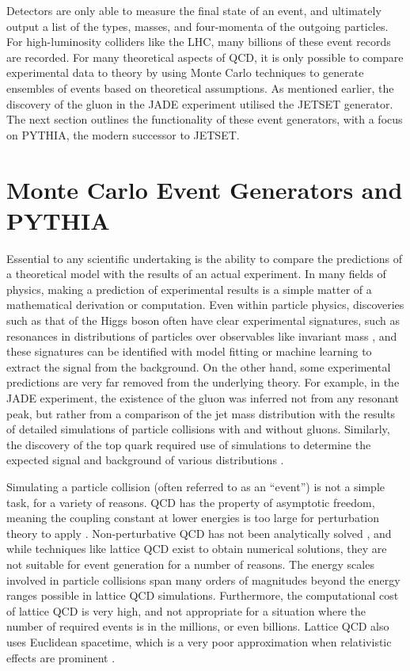 \documentclass[12pt,a4paper]{report}
\begin{document}
Detectors are only able to measure the final state of an event, and ultimately output a list of the types, masses, and four-momenta of the outgoing particles. For high-luminosity colliders like the LHC, many billions of these event records are recorded. For many theoretical aspects of QCD, it is only possible to compare experimental data to theory by using Monte Carlo techniques to generate ensembles of events based on theoretical assumptions. As mentioned earlier, the discovery of the gluon in the JADE experiment utilised the JETSET generator. The next section outlines the functionality of these event generators, with a focus on PYTHIA, the modern successor to JETSET.

\section{Monte Carlo Event Generators and PYTHIA}
Essential to any scientific undertaking is the ability to compare the predictions of a theoretical model with the results of an actual experiment. In many fields of physics, making a prediction of experimental results is a simple matter of a mathematical derivation or computation. Even within particle physics, discoveries such as that of the Higgs boson often have clear experimental signatures, such as resonances in distributions of particles over observables like invariant mass \cite{ATLAS:2012yve,CMS:2012qbp}, and these signatures can be identified with model fitting or machine learning to extract the signal from the background. On the other hand, some experimental predictions are very far removed from the underlying theory. For example, in the JADE experiment, the existence of the gluon was inferred not from any resonant peak, but rather from a comparison of the jet mass distribution with the results of detailed simulations of particle collisions with and without gluons. Similarly, the discovery of the top quark required use of simulations to determine the expected signal and background of various distributions \cite{CDF:1995wbb,D0:1995jca}.

Simulating a particle collision (often referred to as an ``event'') is not a simple task, for a variety of reasons. QCD has the property of asymptotic freedom, meaning the coupling constant at lower energies is too large for perturbation theory to apply \cite{Gross:1973ju,Politzer:1974fr}. Non-perturbative QCD has not been analytically solved \cite{ParticleDataGroup:2024cfk}, and while techniques like lattice QCD exist to obtain numerical solutions, they are not suitable for event generation for a number of reasons. The energy scales involved in particle collisions span many orders of magnitudes beyond the energy ranges possible in lattice QCD simulations. Furthermore, the computational cost of lattice QCD is very high, and not appropriate for a situation where the number of required events is in the millions, or even billions. Lattice QCD also uses Euclidean spacetime, which is a very poor approximation when relativistic effects are prominent \cite{Salam:2010zt}.
\end{document}
